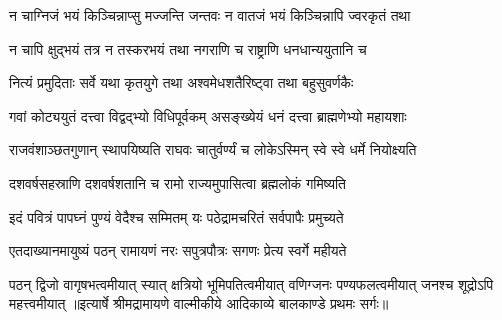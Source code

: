 \twolineshloka
{न चाग्निजं भयं किञ्चिन्नाप्सु मज्जन्ति जन्तवः}
{न वातजं भयं किञ्चिन्नापि ज्वरकृतं तथा}%

\twolineshloka
{न चापि क्षुद्भयं तत्र न तस्करभयं तथा}
{नगराणि च राष्ट्राणि धनधान्ययुतानि च}%

\twolineshloka
{नित्यं प्रमुदिताः सर्वे यथा कृतयुगे तथा}
{अश्वमेधशतैरिष्ट्वा तथा बहुसुवर्णकैः}%

\twolineshloka
{गवां कोट्ययुतं दत्त्वा विद्वद्‌भ्यो विधिपूर्वकम्}
{असङ्ख्येयं धनं दत्त्वा ब्राह्मणेभ्यो महायशाः}%

\twolineshloka
{राजवंशाञ्छतगुणान् स्थापयिष्यति राघवः}
{चातुर्वर्ण्यं च लोकेऽस्मिन् स्वे स्वे धर्मे नियोक्ष्यति}%

\twolineshloka
{दशवर्षसहस्राणि दशवर्षशतानि च}
{रामो राज्यमुपासित्वा ब्रह्मलोकं गमिष्यति}%

\twolineshloka
{इदं पवित्रं पापघ्नं पुण्यं वेदैश्च सम्मितम्}
{यः पठेद्रामचरितं सर्वपापैः प्रमुच्यते}%

\twolineshloka
{एतदाख्यानमायुष्यं पठन् रामायणं नरः}
{सपुत्रपौत्रः सगणः प्रेत्य स्वर्गे महीयते}%

\fourlineindentedshloka
{पठन् द्विजो वागृषभत्वमीयात्}
{स्यात् क्षत्रियो भूमिपतित्वमीयात्}
{वणिग्जनः पण्यफलत्वमीयात्}
{जनश्च शूद्रोऽपि महत्त्वमीयात्}%
{॥इत्यार्षे श्रीमद्रामायणे वाल्मीकीये आदिकाव्ये बालकाण्डे प्रथमः सर्गः॥}

\closesection